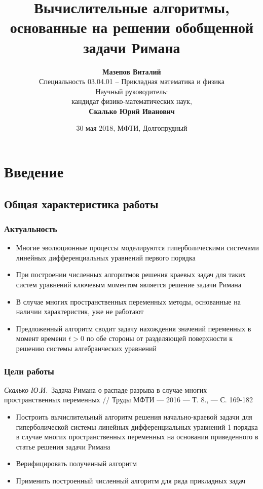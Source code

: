 \documentclass[unicode,aspectratio=43]{beamer}
\title[Задача Римана о распаде разрыва]{Вычислительные алгоритмы, основанные на решении обобщенной задачи Римана}
\date{30 мая 2018, МФТИ, Долгопрудный}
\author[Мазепов Виталий]{\textbf{Мазепов Виталий}\\[1ex]
	Специальность 03.04.01 -- Прикладная математика и физика \\[1ex]
	Научный руководитель:\\
	кандидат физико-математических наук,\\
	\textbf{Скалько Юрий Иванович}}
\institute[МФТИ]{Московский физико-технический институт}
\begin{document}
\begin{frame}[plain]
\maketitle
\end{frame}

\begin{frame}[plain]

\tableofcontents
\end{frame}

\section{Введение}

\subsection{Общая характеристика работы}

\begin{frame}\frametitle{Актуальность}
\begin{itemize}

\item	Многие эволюционные процессы моделируются гиперболическими системами линейных дифференциальных уравнений первого порядка
	
\item	При построении численных алгоритмов решения краевых задач для таких систем уравнений ключевым моментом является решение задачи Римана
	
\item	В случае многих пространственных переменных методы, основанные на наличии характеристик, уже не работают
	
\item	Предложенный алгоритм сводит задачу нахождения значений переменных в момент
времени $t > 0$ по обе стороны от разделяющей поверхности к решению
системы алгебраических уравнений
\end{itemize}
\end{frame}


\begin{frame}\frametitle{Цели работы}
	\textit{Скалько Ю.И.} Задача Римана о распаде разрыва в случае многих пространственных переменных // Труды МФТИ --- 2016 --- Т. 8.,  --- С. 169-182
	\begin{itemize}
	\item Построить вычислительный алгоритм решения начально-краевой задачи для гиперболической системы линейных дифференциальных уравнений 1 порядка в случае многих пространственных переменных на основании приведенного в статье решения задачи Римана
	\pause
	\item Верифицировать полученный алгоритм
	\item Применить построенный численный алгоритм для ряда прикладных задач
	\end{itemize}
\end{frame}
\end{document}
